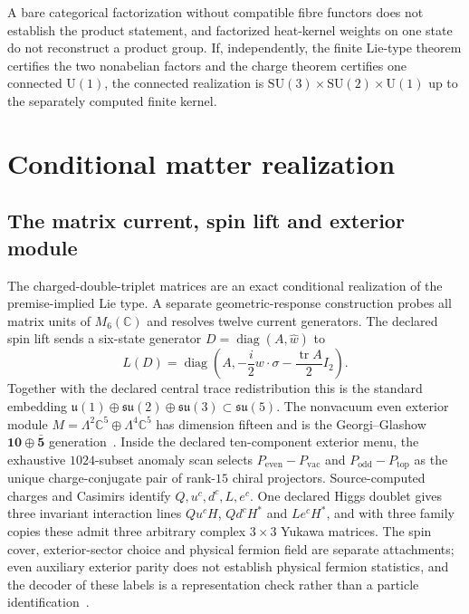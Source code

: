 \documentclass[11pt]{article}
\begin{document}
A bare categorical factorization without compatible fibre functors does not
establish the product statement, and factorized heat-kernel weights on one
state do not reconstruct a product group. If, independently, the finite
Lie-type theorem certifies the two nonabelian factors and the charge theorem
certifies one connected \(\mathrm U(1)\), the connected realization is
\(\mathrm{SU}(3)\times\mathrm{SU}(2)\times\mathrm U(1)\) up to the separately
computed finite kernel.

\section{Conditional matter realization}
\label{sec:matter}
\label{ass:matter-typing}

\subsection{The matrix current, spin lift and exterior module}

The charged-double-triplet matrices are an exact conditional realization of
the premise-implied Lie type. A separate geometric-response construction
probes all matrix units of \(M_6(\mathbb C)\) and resolves twelve current
generators. The declared spin lift sends a six-state generator
\(D=\operatorname{diag}(A,\widehat w)\) to
\[
L(D)=\operatorname{diag}\left(A,-\frac{i}{2}w\cdot\sigma-
\frac{\operatorname{tr}A}{2}I_2\right).
\]
Together with the declared central trace redistribution this is the standard
embedding \(\mathfrak u(1)\oplus\mathfrak{su}(2)\oplus\mathfrak{su}(3)
\subset\mathfrak{su}(5)\). The nonvacuum even exterior module
\(M=\Lambda^2\mathbb C^5\oplus\Lambda^4\mathbb C^5\) has dimension fifteen and
is the Georgi--Glashow \(\mathbf{10}\oplus\bar{\mathbf 5}\)
generation~\cite{pwgeorgi1974unity}. Inside the declared ten-component
exterior menu, the exhaustive \(1024\)-subset anomaly scan selects
\(P_{\mathrm{even}}-P_{\mathrm{vac}}\) and
\(P_{\mathrm{odd}}-P_{\mathrm{top}}\) as the unique charge-conjugate pair of
rank-\(15\) chiral projectors. Source-computed charges and Casimirs identify
\(Q,u^c,d^c,L,e^c\). One declared Higgs doublet gives three invariant
interaction lines \(Qu^cH\), \(Qd^cH^*\) and \(Le^cH^*\), and with three
family copies these admit three arbitrary complex \(3\times3\) Yukawa
matrices. The spin cover, exterior-sector choice and physical fermion field
are separate attachments; even auxiliary exterior parity does not establish
physical fermion statistics, and the decoder of these labels is a
representation check rather than a particle identification~\cite{ophparticles}.
\end{document}
